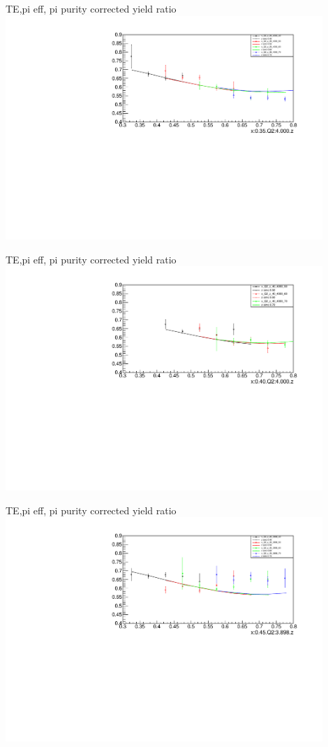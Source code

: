 \begin{frame}{TE,pi eff, pi purity corrected yield ratio}
\includegraphics[width = 0.9\textwidth]{results/yield/statistics_corr/x_Q2_35_4000_ratio.pdf}
\end{frame}
\begin{frame}{TE,pi eff, pi purity corrected yield ratio}
\includegraphics[width = 0.9\textwidth]{results/yield/statistics_corr/x_Q2_40_4000_ratio.pdf}
\end{frame}
\begin{frame}{TE,pi eff, pi purity corrected yield ratio}
\includegraphics[width = 0.9\textwidth]{results/yield/statistics_corr/x_Q2_45_3898_ratio.pdf}
\end{frame}
